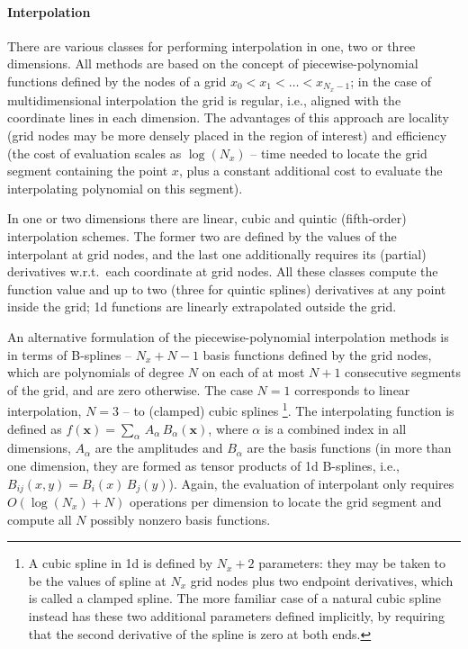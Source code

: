 \documentclass[12pt]{article}
\newcommand{\bx}{\boldsymbol{x}}
\begin{document}
\paragraph{Interpolation} \label{sec:SplineInterpolation}
There are various classes for performing interpolation in one, two or three dimensions.
All methods are based on the concept of piecewise-polynomial functions defined by the nodes of a grid $x_0<x_1<\dots<x_{N_x-1}$; in the case of multidimensional interpolation the grid is regular, i.e., aligned with the coordinate lines in each dimension. The advantages of this approach are locality (grid nodes may be more densely placed in the region of interest) and efficiency (the cost of evaluation scales as $\log(N_x)$ -- time needed to locate the grid segment containing the point $x$, plus a constant additional cost to evaluate the interpolating polynomial on this segment).

In one or two dimensions there are linear, cubic and quintic (fifth-order) interpolation schemes. The former two are defined by the values of the interpolant at grid nodes, and the last one additionally requires its (partial) derivatives w.r.t.\ each coordinate at grid nodes. All these classes compute the function value and up to two (three for quintic splines) derivatives at any point inside the grid; 1d functions are linearly extrapolated outside the grid.

An alternative formulation of the piecewise-polynomial interpolation methods is in terms of B-splines -- $N_x+N-1$ basis functions defined by the grid nodes, which are polynomials of degree $N$ on each of at most $N+1$ consecutive segments of the grid, and are zero otherwise. The case $N=1$ corresponds to linear interpolation, $N=3$ -- to (clamped) cubic splines%
\footnote{A cubic spline in 1d is defined by $N_x+2$ parameters: they may be taken to be the values of spline at $N_x$ grid nodes plus two endpoint derivatives, which is called a clamped spline. The more familiar case of a natural cubic spline instead has these two additional parameters defined implicitly, by requiring that the second derivative of the spline is zero at both ends.}.
The interpolating function is defined as $f(\bx) = \sum_\alpha\,A_\alpha\,B_\alpha(\bx)$, where $\alpha$ is a combined index in all dimensions, $A_\alpha$ are the amplitudes and $B_\alpha$ are the basis functions (in more than one dimension, they are formed as tensor products of 1d B-splines, i.e., $B_{ij}(x,y) = B_i(x)\,B_j(y)$). Again, the evaluation of interpolant only requires $O(\log(N_x)+N)$ operations per dimension to locate the grid segment and compute all $N$ possibly nonzero basis functions.
\end{document}
